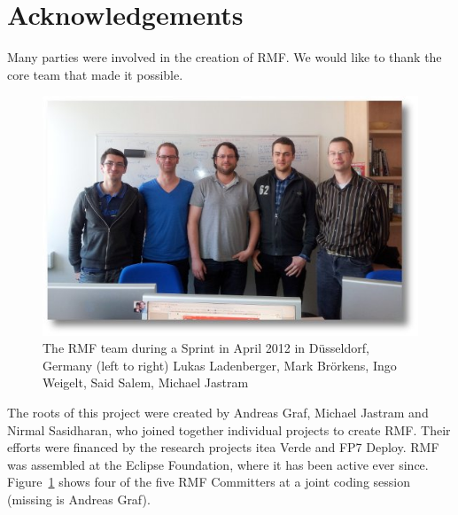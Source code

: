 % 

\section{Acknowledgements}

Many parties were involved in the creation of RMF.  We would like to thank the core team that made it possible.

\begin{figure}
  \centering
  \includegraphics[width=\textwidth]{../rmf-images/2012_03_sprint_team.jpg}
  \caption{The RMF team during a Sprint in April 2012 in Düsseldorf, Germany (left to right) Lukas Ladenberger, Mark Brörkens, Ingo Weigelt, Said Salem, Michael Jastram}
  \label{fig:intro_core_team}
\end{figure}

The roots of this project were created by Andreas Graf, Michael Jastram and Nirmal Sasidharan, who joined together individual projects to create RMF.  Their efforts were financed by the research projects itea Verde and FP7 Deploy.  RMF was assembled at the Eclipse Foundation, where it has been active ever since.  Figure~\ref{fig:intro_core_team} shows four of the five RMF Committers at a joint coding session (missing is Andreas Graf).

